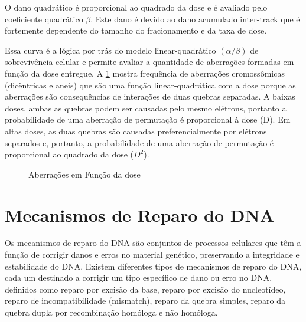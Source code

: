 \documentclass[11pt,a4paper]{article}
\begin{document}
	O dano quadrático é proporcional ao quadrado da dose e é avaliado pelo coeficiente quadrático $\beta$.  Este dano é devido ao dano acumulado inter-track que é fortemente dependente do tamanho do fracionamento e da taxa de dose.

	Essa curva é a lógica por trás do modelo linear-quadrático $(\alpha/\beta)$ de sobrevivência celular e permite avaliar a quantidade de aberrações formadas em função da dose entregue. A \ref{fig:aberracaoEDose} mostra frequência de aberrações cromossômicas (dicêntricas e aneis) que são uma função linear-quadrática com a dose porque as aberrações são consequências de interações de duas quebras separadas. A baixas doses, ambas as quebras podem ser causadas pelo mesmo elétrons, portanto a probabilidade de uma aberração de permutação é proporcional à dose (D). Em altas doses, as duas quebras são causadas preferencialmente por elétrons separados e, portanto, a probabilidade de uma aberração de permutação é proporcional ao quadrado da dose ($D^2$).

	\begin{figure}[h]
		\centering
		\caption{Aberrações em Função da dose}
		\label{fig:aberracaoEDose}
	\end{figure}

\section{Mecanismos de Reparo do DNA}

	Os mecanismos de reparo do DNA são conjuntos de processos celulares que têm a função de corrigir danos e erros no material genético, preservando a integridade e estabilidade do DNA. Existem diferentes tipos de mecanismos de reparo do DNA, cada um destinado a corrigir um tipo específico de dano ou erro no DNA, definidos como reparo por excisão da base, reparo por excisão do nucleotídeo, reparo de incompatibilidade (mismatch), reparo da quebra simples, reparo da quebra dupla por recombinação homóloga e não homóloga. 
\end{document}
